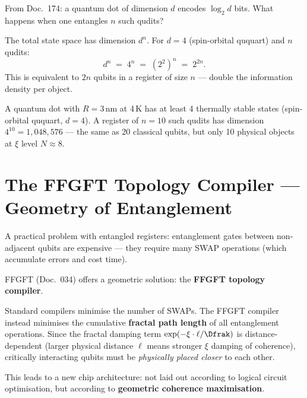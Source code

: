 From Doc.~174: a quantum dot of dimension $d$
encodes $\log_2 d$ bits.
What happens when one entangles $n$ such qudits?

The total state space has dimension $d^n$.
For $d = 4$ (spin-orbital ququart) and $n$ qudits:
\begin{equation}
  d^n \;=\; 4^n \;=\; (2^2)^n \;=\; 2^{2n}.
\end{equation}
This is equivalent to $2n$ qubits in a register
of size $n$ --- double the information density per object.

\begin{keyresult}
A quantum dot with $R = 3$\,nm at 4\,K
has at least 4 thermally stable states
(spin-orbital ququart, $d = 4$).
A register of $n = 10$ such qudits
has dimension $4^{10} = 1,048,576$ ---
the same as 20 classical qubits, but
only 10 physical objects at $\xi$ level $N \approx 8$.
\end{keyresult}

\section{The FFGFT Topology Compiler --- Geometry of Entanglement}
\label{sec:compiler}

A practical problem with entangled registers:
entanglement gates between non-adjacent qubits
are expensive --- they require many SWAP operations
(which accumulate errors and cost time).

FFGFT (Doc.~034) offers a geometric
solution: the \textbf{FFGFT topology compiler}.

Standard compilers minimise the number of SWAPs.
The FFGFT compiler instead minimises the cumulative
\textbf{fractal path length} of all entanglement operations.
Since the fractal damping term $\exp(-\xi \cdot \ell / \Dfrak)$
is distance-dependent (larger physical distance $\ell$
means stronger $\xi$ damping of coherence),
critically interacting qubits must be
\emph{physically placed closer} to each other.

This leads to a new chip architecture:
not laid out according to logical circuit optimisation,
but according to \textbf{geometric coherence maximisation}.

